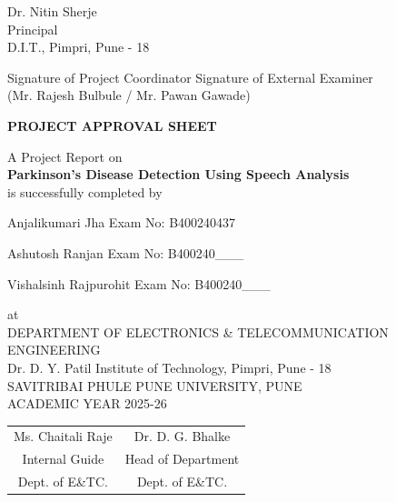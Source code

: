 \documentclass[oneside,a4paper,12pt]{report}
\begin{document}
\begin{center}
\vspace*{2\baselineskip}
Dr. Nitin Sherje \\
Principal\\
D.I.T., Pimpri, Pune - 18
\end{center}
\vspace*{1\baselineskip}
Signature of Project Coordinator \hspace{20 mm} Signature of External Examiner \\
(Mr. Rajesh Bulbule / Mr. Pawan Gawade)
\newpage

\begin{center}
\textbf{PROJECT APPROVAL SHEET}
\end{center}
\vspace*{1\baselineskip}
\begin{center}
A Project Report on \\
\textbf{Parkinson's Disease Detection Using Speech Analysis} \\
\vspace*{1\baselineskip}
is successfully completed by
\end{center}
\centerline{Anjalikumari Jha \hspace{20 mm} Exam No: B400240437}
\centerline{Ashutosh Ranjan \hspace{20 mm} Exam No: B400240\_\_\_}
\centerline{Vishalsinh Rajpurohit \hspace{14 mm} Exam No: B400240\_\_\_}
\begin{center}
at \\
DEPARTMENT OF ELECTRONICS \& TELECOMMUNICATION ENGINEERING \\
Dr. D. Y. Patil Institute of Technology, Pimpri, Pune - 18 \\
SAVITRIBAI PHULE PUNE UNIVERSITY, PUNE \\
ACADEMIC YEAR 2025-26
\end{center}
\vspace*{2\baselineskip}
\begin{tabular}{c c}
Ms. Chaitali Raje &  \hspace{40 mm} Dr. D. G. Bhalke\\
Internal Guide   &  \hspace{40 mm} Head of Department \\
Dept. of E\&TC.  &	\hspace{40 mm}Dept. of E\&TC.  \\
\end{tabular}
\newpage
\end{document}
